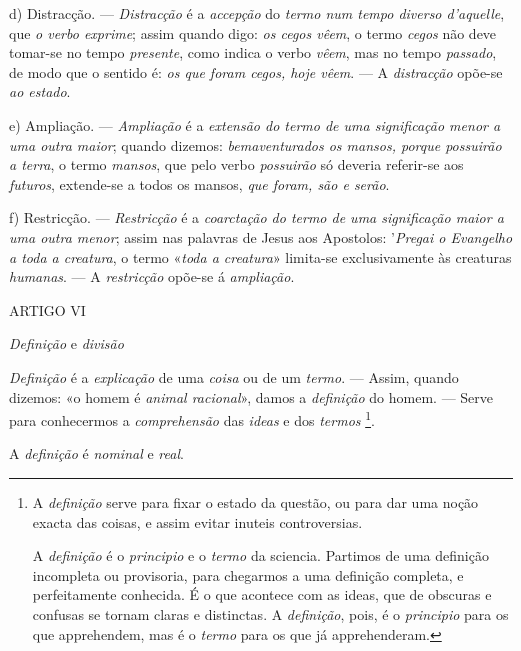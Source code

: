 d) Distracção. --- \emph{Distracção} é a \emph{accepção} do \emph{termo num tempo diverso d'aquelle}, que \emph{o verbo exprime}; assim quando digo: \emph{os cegos vêem}, o termo \emph{cegos} não deve tomar-se no tempo \emph{presente}, como indica o verbo \emph{vêem}, mas no tempo \emph{passado}, de modo que o sentido é: \emph{os que foram cegos, hoje vêem}. --- A \emph{distracção} opõe-se \emph{ao estado}.

e) Ampliação. --- \emph{Ampliação} é a \emph{extensão do termo de uma significação menor a uma outra maior}; quando dizemos: \emph{bemaventurados os mansos, porque possuirão a terra}, o termo \emph{mansos}, que pelo verbo \emph{possuirão} só deveria referir-se aos \emph{futuros}, extende-se a todos os mansos, \emph{que foram, são e serão}.

f) Restricção. --- \emph{Restricção} é a \emph{coarctação do termo de uma significação maior a uma outra menor}; assim nas palavras de Jesus aos Apostolos: '\emph{Pregai o Evangelho a toda a creatura}, o termo «\emph{toda a creatura}» limita-se exclusivamente às creaturas \emph{humanas}. --- A \emph{restricção} opõe-se á \emph{ampliação}.

ARTIGO VI

\emph{Definição} e \emph{divisão}


  
\emph{Definição} é a \emph{explicação} de uma \emph{coisa} ou de um \emph{termo}. --- Assim, quando dizemos: «o homem é \emph{animal racional}», damos a \emph{definição} do homem. --- Serve para conhecermos a \emph{comprehensão} das \emph{ideas} e dos \emph{termos} \footnote{A \emph{definição} serve para fixar o estado da questão, ou para dar uma noção exacta das coisas, e assim evitar inuteis controversias.\par A \emph{definição} é o \emph{principio} e o \emph{termo} da sciencia. Partimos de uma definição incompleta ou provisoria, para chegarmos a uma definição completa, e perfeitamente conhecida. É o que acontece com as ideas, que de obscuras e confusas se tornam claras e distinctas. A \emph{definição}, pois, é o \emph{principio} para os que apprehendem, mas é o \emph{termo} para os que já apprehenderam.}.


A \emph{definição} é \emph{nominal} e \emph{real}.

